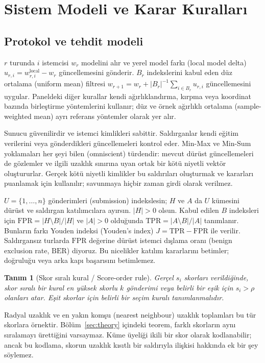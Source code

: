 \documentclass[journal]{IEEEtran}
\newtheorem{definition}{Tanım}
\newcommand{\BER}{\mathrm{BER}}
\begin{document}
\section{Sistem Modeli ve Karar Kuralları}\label{sec:model}
\subsection{Protokol ve tehdit modeli}
$r$ turunda $i$ istemcisi $w_r$ modelini alır ve yerel model farkı (local model delta) $u_{r,i}=w^{\mathrm{local}}_{r,i}-w_r$ güncellemesini gönderir. $B_r$ indekslerini kabul eden düz ortalama (uniform mean) filtresi $w_{r+1}=w_r+|B_r|^{-1}\sum_{i\in B_r}u_{r,i}$ güncellemesini uygular. Paneldeki diğer kurallar kendi ağırlıklandırma, kırpma veya koordinat bazında birleştirme yöntemlerini kullanır; düz ve örnek ağırlıklı ortalama (sample-weighted mean) ayrı referans yöntemler olarak yer alır.

Sunucu güvenilirdir ve istemci kimlikleri sabittir. Saldırganlar kendi eğitim verilerini veya gönderdikleri güncellemeleri kontrol eder. Min-Max ve Min-Sum yoklamaları her şeyi bilen (omniscient) türdendir: mevcut dürüst güncellemeleri de gözlemler ve ilgili uzaklık sınırına uyan ortak bir kötü niyetli vektör oluştururlar. Gerçek kötü niyetli kimlikler bu saldırıları oluşturmak ve kararları puanlamak için kullanılır; savunmaya hiçbir zaman girdi olarak verilmez.

$U=\{1,\ldots,n\}$ gönderimleri (submission) indekslesin; $H$ ve $A$ da $U$ kümesini dürüst ve saldırgan katılımcılara ayırsın. $|H|>0$ olsun. Kabul edilen $B$ indeksleri için $\mathrm{FPR}=|H\setminus B|/|H|$ ve $|A|>0$ olduğunda $\mathrm{TPR}=|A\setminus B|/|A|$ tanımlanır. Bunların farkı Youden indeksi (Youden's index) $J=\mathrm{TPR}-\mathrm{FPR}$ ile verilir. Saldırgansız turlarda $\mathrm{FPR}$ değerine dürüst istemci dışlama oranı (benign exclusion rate, $\BER$) diyoruz. Bu nicelikler katılım kararlarını betimler; doğruluğu veya arka kapı başarısını betimlemez.

\begin{definition}[Skor sıralı kural / Score-order rule]\label{def:dispersion}
Gerçel $s_i$ skorları verildiğinde, skor sıralı bir kural en yüksek skorlu $k$ gönderimi veya belirli bir eşik için $s_i>\rho$ olanları atar. Eşit skorlar için belirli bir seçim kuralı tanımlanmalıdır.
\end{definition}
Radyal uzaklık ve en yakın komşu (nearest neighbour) uzaklık toplamları bu tür skorlara örnektir. Bölüm~\ref{sec:theory} içindeki teorem, farklı skorların aynı sıralamayı ürettiğini varsaymaz. Küme üyeliği ikili bir skor olarak kodlanabilir; ancak bu kodlama, skorun uzaklık kısıtlı bir saldırıyla ilişkisi hakkında ek bir şey söylemez.
\end{document}

